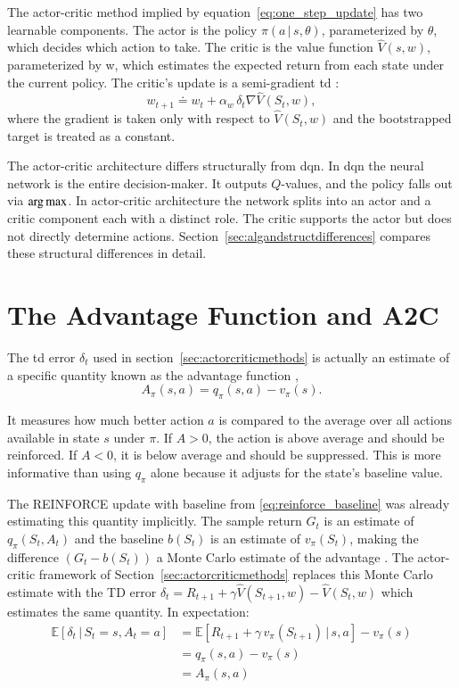The actor-critic method implied by equation~\eqref{eq:one_step_update} has two learnable components. The actor is the policy $\pi(a\,|\,s, \theta)$, parameterized by $\theta$, which decides which action to take. The critic is the value function $\hat{V}(s, w)$, parameterized by w, which estimates the expected return from each state under the current policy. The critic's update is a semi-gradient \acrshort{td} \citep[p.~203]{suttonReinforcementLearningIntroduction2020}:
\begin{equation}
	w_{t+1} \doteq w_t + \alpha_{w}\,\delta_t \nabla \hat{V}(S_t, w),
\end{equation}
where the gradient is taken only with respect to $\hat{V}(S_t, w)$ and the bootstrapped target is treated as a constant.

The actor-critic architecture differs structurally from \acrshort{dqn}. In \acrshort{dqn} the neural network is the entire decision-maker. It outputs $Q$-values, and the policy falls out via $\operatorname*{arg\,max}$. In actor-critic architecture the network splits into an actor and a critic component each with a distinct role. The critic supports the actor but does not directly determine actions. Section~\ref{sec:algandstructdifferences} compares these structural differences in detail.


\section{The Advantage Function and A2C}
\label{sec:advantagefunctionanda2c}

The \acrshort{td} error $\delta_t$ used in section~\ref{sec:actorcriticmethods} is actually an estimate of a specific quantity known as the advantage function \citep{mnihAsynchronousMethodsDeep2016},
\begin{equation}
	A_\pi(s, a) = q_\pi(s, a) - v_\pi(s).
\end{equation}
 
 It measures how much better action $a$ is compared to the average over all actions available in state $s$ under $\pi$. If $A > 0$, the action is above average and should be reinforced. If  $A < 0$, it is below average and should be suppressed. This is more informative than using $q_\pi$ alone because it adjusts for the state's baseline value. 
 
The REINFORCE update with baseline from \eqref{eq:reinforce_baseline} was already estimating this quantity implicitly. The sample return $G_t$ is an estimate of $q_\pi(S_t, A_t)$ and the baseline $b(S_t)$ is an estimate of $v_\pi(S_t)$, making the difference $(G_t - b(S_t))$ a Monte Carlo estimate of the advantage \citep{mnihAsynchronousMethodsDeep2016}. The actor-critic framework of Section~\ref{sec:actorcriticmethods} replaces this Monte Carlo estimate with the TD error $\delta_t = R_{t+1} + \gamma \hat{V}(S_{t+1}, w) - \hat{V}(S_t, w)$ which estimates the same quantity. In expectation:
\begin{align}
	\mathbb{E}[\delta_t\,|\, S_t = s, A_t = a] &= \mathbb{E}[R_{t+1} + \gamma\,v_\pi(S_{t+1})\,|\,s, a] - v_\pi(s) \nonumber \\
	&= q_\pi(s,a) - v_\pi(s) \nonumber \\
	&= A_\pi(s,a)
\end{align}

